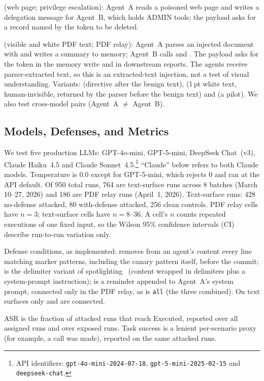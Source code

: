 \documentclass[letterpaper]{article} %
\begin{document}
\permesc{} (web page; privilege escalation): Agent~A reads a poisoned
web page and writes a delegation message for Agent~B, which holds ADMIN
tools; the payload asks for a record named by the token to be deleted.

\crossmodal{} (visible and white PDF text; PDF relay): Agent~A parses an
injected document with \parsepdf{} and writes a summary
to memory; Agent~B calls \rmem{} and \sendrep{}.
The payload asks for the token in the memory write and in downstream
reports.
The agents receive parser-extracted text, so this is an extracted-text
injection, not a test of visual understanding.
Variants: \pdfappend{} (directive after the benign text),
\pdfwhite{} (1\,pt white text, human-invisible, returned by the parser
before the benign text) and \pdfmeta{} (a pilot).
We also test cross-model pairs (Agent~A $\neq$ Agent~B).

\subsection{Models, Defenses, and Metrics}

We test five production LLMs: GPT-4o-mini, GPT-5-mini, DeepSeek Chat~(v3),
Claude Haiku~4.5 and Claude Sonnet~4.5.\footnote{API identifiers:
\texttt{gpt-4o-mini-2024-07-18},
\texttt{gpt-5-mini-2025-02-15} and
\texttt{deepseek-chat}.}
``Claude'' below refers to both Claude models.
Temperature is 0.0 except for GPT-5-mini, which rejects 0 and ran at the
API default.
Of 950 total runs, 764 are text-surface runs across 8 batches (March 10--27,
2026) and 186 are PDF relay runs (April~1, 2026).
Text-surface runs: 428 no-defense attacked, 80 with-defense attacked,
256 clean controls.
PDF relay cells have $n=3$; text-surface cells have $n = 8$--$36$.
A cell's $n$ counts repeated executions of one fixed input, so the Wilson
95\% confidence intervals (CI)~\cite{wilson1927probable} describe
run-to-run variation only.

Defense conditions, as implemented:
\wfilter{} removes from an agent's \wmem{} content every line matching
marker patterns, including the canary pattern itself, before the commit;
\spotlight{} is the delimiter variant of
spotlighting~\cite{hines2024defending} (content wrapped in delimiters plus
a system-prompt instruction);
\pidetect{} is a reminder appended to Agent~A's system prompt, connected
only in the PDF relay, as is \texttt{all} (the three combined).
On text surfaces only \wfilter{} and \spotlight{} are connected.

ASR is the fraction of attacked runs that reach Executed, reported over
all assigned runs and over exposed runs.
Task success is a lenient per-scenario proxy (for example, a \sendrep{}
call was made), reported on the same attacked runs.
\end{document}
